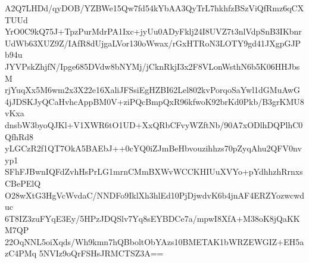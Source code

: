 A2Q7LHDd/qyDOB/YZBWe15Qw7fd54kYbAA3QyTrL7hkhfzBSzViQfRmz6qCXTUUd
YrO0C9kQ75J+TpzPurMdrPA1Ixc+jyUu0ADyFklj24I8UVZ7t3nlVdpSnB3IKbnr
UdWb63XUZ9Z/IAfR8dUjgaLVor130oWwax/rGxHTRoN3LOTY9gd41JXgpGJPb94u
JYVPskZhjfN/Ipge685DVdw8bNYMj/jCknRkjI3x2F8VLonWsthN6b5K06HHJbsM
rjYuqXx5M6wm2x3X22e16XaliJFSsiEgHZBI62Lel802kvPorqoSaYwl1dGMuAwG
4jJDSKJyQCaHvhcAppBM0V+ziPQcBmpQxR96kfwoK92brKd0Pkb/B3grKMU8vKxa
dnsbW3byoQJKl+V1XWR6tO1UD+XxQRbCFvyWZftNb/90A7xODlhDQPlhC0QfhRd8
yLGCzR2f1QT7OkA5BAEbJ++0cYQ0iZJmBeHbvouzihhzs70pZyqAhu2QFV0nvyp1
SFhFJBwnIQFdZvhHsPrLG1mrnCMmBXWvWCCKHIUuXVYo+pYdhhzhRrnxsCBePElQ
O28wXtG3HgVcWvdaC/NNDFo9IklXh3hlEd10PjDjwdvK6b4jnAF4ERZYozwcwduc
6T8IZ3zuFYqE3Ey/5HPzJDQSlv7Yq8sEYBDCe7a/mpwI8XfA+M38oK8jQaKKM7QP
22OqNNL5oiXqds/Wh9kmn7hQBboltObYAzs10BMETAK1bWRZEWGIZ+EH5azC4PMq
5NVIz9oQrFSHsJRMCTSZ3A==
